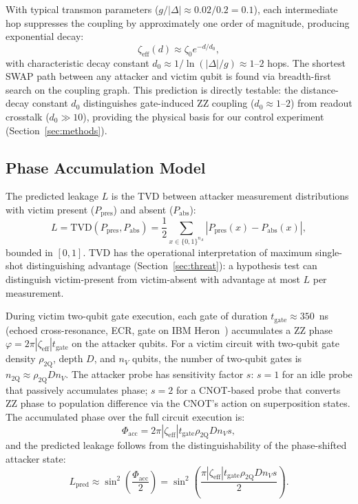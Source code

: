 \documentclass[ASNA,twocolumn]{USG}
\begin{document}
With typical transmon parameters ($g/|\Delta| \approx 0.02/0.2 = 0.1$), each intermediate hop suppresses the coupling by approximately one order of magnitude, producing exponential decay:
\begin{equation}
    \zeta_{\mathrm{eff}}(d) \approx \zeta_0 e^{-d/d_0},
\label{eq:decay}
\end{equation}
with characteristic decay constant $d_0 \approx 1/\ln(|\Delta|/g) \approx 1$--$2$ hops. The shortest SWAP path between any attacker and victim qubit is found via breadth-first search on the coupling graph. This prediction is directly testable: the distance-decay constant $d_0$ distinguishes gate-induced ZZ coupling ($d_0 \approx 1$--$2$) from readout crosstalk ($d_0 \gg 10$), providing the physical basis for our control experiment (Section~\ref{sec:methods}).

\subsection{Phase Accumulation Model}

The predicted leakage $L$ is the TVD between attacker measurement distributions with victim present ($P_{\mathrm{pres}}$) and absent ($P_{\mathrm{abs}}$):
\begin{equation}
    L = \mathrm{TVD}(P_{\mathrm{pres}}, P_{\mathrm{abs}}) = \frac{1}{2}\sum_{x \in \{0,1\}^{n_A}} |P_{\mathrm{pres}}(x) - P_{\mathrm{abs}}(x)|,
\label{eq:tvd_def}
\end{equation}
bounded in $[0,1]$. TVD has the operational interpretation of maximum single-shot distinguishing advantage (Section~\ref{sec:threat}): a hypothesis test can distinguish victim-present from victim-absent with advantage at most $L$ per measurement.

During victim two-qubit gate execution, each gate of duration $t_{\mathrm{gate}} \approx 350$~ns (echoed cross-resonance, ECR, gate on IBM Heron~\cite{ibmq2026}) accumulates a ZZ phase $\varphi = 2\pi |\zeta_{\mathrm{eff}}| t_{\mathrm{gate}}$ on the attacker qubits. For a victim circuit with two-qubit gate density $\rho_{\mathrm{2Q}}$, depth $D$, and $n_V$ qubits, the number of two-qubit gates is $n_{\mathrm{2Q}} \approx \rho_{\mathrm{2Q}} D n_V$. The attacker probe has sensitivity factor $s$: $s=1$ for an idle probe that passively accumulates phase; $s=2$ for a CNOT-based probe that converts ZZ phase to population difference via the CNOT's action on superposition states. The accumulated phase over the full circuit execution is:
\begin{equation}
    \Phi_{\mathrm{acc}} = 2\pi |\zeta_{\mathrm{eff}}| t_{\mathrm{gate}} \rho_{\mathrm{2Q}} D n_V s,
\end{equation}
and the predicted leakage follows from the distinguishability of the phase-shifted attacker state:
\begin{equation}
    L_{\mathrm{pred}} \approx \sin^2\left(\frac{\Phi_{\mathrm{acc}}}{2}\right) = \sin^2\left(\frac{\pi |\zeta_{\mathrm{eff}}| t_{\mathrm{gate}} \rho_{\mathrm{2Q}} D n_V s}{2}\right).
\label{eq:leakage_model}
\end{equation}
\end{document}
